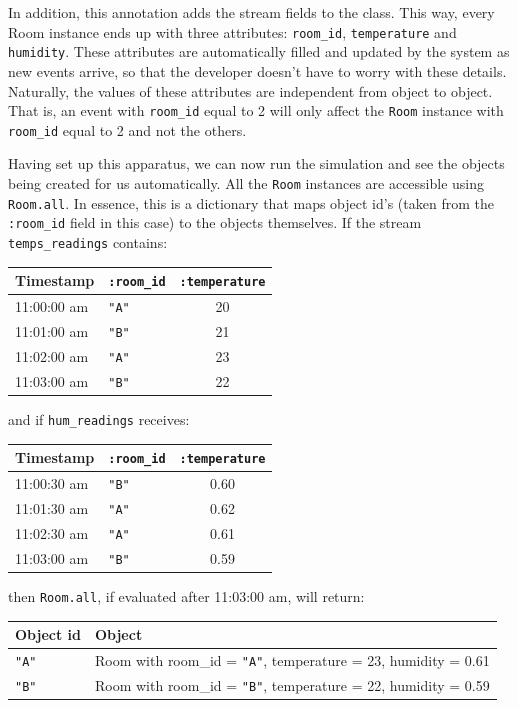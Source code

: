 \documentclass{report}
\begin{document}
In addition, this annotation adds the stream fields to
the class. This way, every Room instance ends up with three
attributes: \verb=room_id=, \verb=temperature= and
\verb=humidity=. These attributes are automatically filled and updated
by the system as new events arrive, so that the developer doesn't have
to worry with these details. Naturally, the values of these attributes
are independent from object to object. That is, an event with
\verb=room_id= equal to 2 will only affect the \verb=Room= instance
with \verb=room_id= equal to 2 and not the others.

Having set up this apparatus, we can now run the simulation and see
the objects being created for us automatically. All the \verb=Room=
instances are accessible using \verb=Room.all=. In essence, this is a
dictionary that maps object id's (taken from the \verb=:room_id= field
in this case) to the objects themselves. If the stream
\verb=temps_readings= contains:

\begin{tabular}{ |l|l|c| }
  \hline
  Timestamp & \verb=:room_id= & \verb=:temperature= \\
  \hline
  11:00:00 am & \verb="A"= & 20 \\
  11:01:00 am & \verb="B"= & 21 \\
  11:02:00 am & \verb="A"= & 23 \\
  11:03:00 am & \verb="B"= & 22 \\
  \hline
\end{tabular}

and if \verb=hum_readings= receives:

\begin{tabular}{ |l|l|c| }
  \hline
  Timestamp & \verb=:room_id= & \verb=:temperature= \\
  \hline
  11:00:30 am & \verb="B"= & 0.60 \\
  11:01:30 am & \verb="A"= & 0.62 \\
  11:02:30 am & \verb="A"= & 0.61 \\
  11:03:00 am & \verb="B"= & 0.59 \\
  \hline
\end{tabular}

then \verb=Room.all=, if evaluated after 11:03:00 am, will return:

\begin{tabular}{ |l|l| }
  \hline
  Object id & Object \\
  \hline
  \verb="A"= & Room with room\_id = \verb="A"=, temperature = 23, humidity = 0.61 \\
  \verb="B"= & Room with room\_id = \verb="B"=, temperature = 22, humidity = 0.59 \\
  \hline
\end{tabular}
\end{document}
